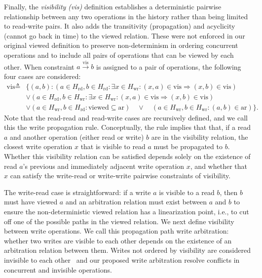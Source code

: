   Finally, the \textit{visibility (vis)} definition establishes a
  deterministic pairwise
  relationship between any two operations in the history
  rather than being limited to read-write pairs.
  It also adds the transitivity (propagation) and acyclicity
  (cannot go back in time) to the viewed relation.
  These were not enforced in our original viewed definition to preserve
  non-determinism in ordering concurrent operations and to include all pairs of
  operations that can be viewed by each other.
  When constraint $a \xrightarrow{\text{vis}} b$ is assigned to a pair
  of operations,
  the following four cases are considered:
  \begin{align*}
	  \text{vis} \triangleq & \{(a, b) : (a \in H_\text{rd}, b \in H_\text{rd} : \exists x \in
      H_\text{wr}: (x, a) \in \text{vis} \Rightarrow (x, b) \in \text{vis}) \\
      & \lor
      (a \in H_\text{rd}, b \in H_\text{wr} : \exists x \in
      H_\text{wr}: (x, a) \in \text{vis} \Rightarrow (x, b) \in \text{vis}) \\
      & \lor
      (a \in H_\text{wr}, b \in H_\text{rd} : \text{viewed} \subseteq
      \text{ar})  \quad \lor \quad
    (a \in H_\text{wr}, b \in H_\text{wr} : (a, b) \in \text{ar})\}.
  \end{align*}
  Note that the read-read and read-write cases are recursively
  defined,
  and we call this the
  write propagation rule. Conceptually, the rule implies that that, if a read $a$
  and another operation (either read or write) $b$ are in the
  visibility relation,
  the closest write operation $x$ that is visible to read $a$ must
  be propagated to $b$. Whether this visibility relation can be satisfied
  depends solely on the existence of read $a$'s previous and
  immediately adjacent write operation $x$, and whether
  that $x$ can satisfy the write-read or write-write pairwise
  constraints of visibility.

  The write-read case is straightforward:
  if a write $a$ is visible to a read $b$, then $b$
  must have viewed $a$ and an arbitration relation must exist between
  $a$ and $b$
  to ensure the non-deterministic viewed relation has a
  linearization point, i.e., to cut off one of the possible paths in
  the viewed relation.
  We next define visibility between write operations. We call this
  propagation path write arbitration: whether two writes are visible to each other depends on the
  existence of an arbitration relation between them.
  Writes not ordered by visibility are considered invisible to each
  other~\cite{viotti2016consistency}
  and our proposed write arbitration resolve conflicts in concurrent and invisible operations.

